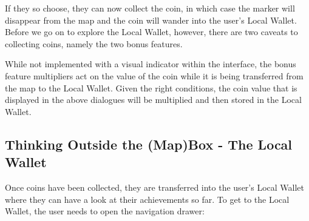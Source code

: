 \documentclass[11pt,a4paper,notitlepage]{article}
\begin{document}
    If they so choose, they can now collect the coin, in which case the marker will disappear from the map and the coin will wander into the user's Local Wallet. Before we go on to explore the Local Wallet, however, there are two caveats to collecting coins, namely the two bonus features.


    While not implemented with a visual indicator within the interface, the bonus feature multipliers act on the value of the coin while it is being transferred from the map to the Local Wallet. Given the right conditions, the coin value that is displayed in the above dialogues will be multiplied and then stored in the Local Wallet.

\subsection{Thinking Outside the (Map)Box - The Local Wallet}

    Once coins have been collected, they are transferred into the user's Local Wallet where they can have a look at their achievements so far. To get to the Local Wallet, the user needs to open the navigation drawer:
\end{document}
